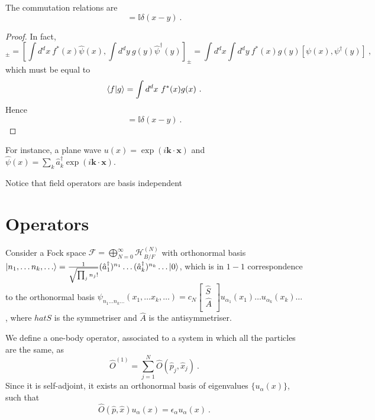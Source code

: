     The commutation relations are 
    \begin{equation*}
        [\psi(x), \psi^\dagger (y)] = \mathbb I \delta (x - y) ~.
    \end{equation*}
    \begin{proof}
        In fact,
        \begin{equation*}
            [\hat \psi (f), \hat \psi^\dagger (g)]_\pm = [\int d^d x ~ f^* (x) \hat \psi(x), \int d^d y ~ g(y) \hat \psi^\dagger (y)]_\pm = \int d^d x \int d^d y ~ f^*(x) g(y) [\psi(x), \psi^\dagger (y)]  ~,
        \end{equation*}
        which must be equal to 
        \begin{equation*}
            \langle f\vert g\rangle = \int d^d x ~ f^* (x) g(x) ~.
        \end{equation*}
        Hence 
        \begin{equation*}
            [\psi(x), \psi^\dagger (y)] = \mathbb I \delta (x - y) ~.
        \end{equation*}
    \end{proof}

    For instance, a plane wave $u(x) = \exp (i \mathbf k \cdot \mathbf x) $ and $\hat \psi(x) = \sum_k \hat a_k^\dagger \exp(i \mathbf k \cdot \mathbf x)$.

    Notice that field operators are basis independent

\section{Operators}

    Consider a Fock space $\mathcal F = \bigoplus_{N=0}^\infty \mathcal H^{(N)}_{B/F}$ with orthonormal basis $\vert n_1, \ldots n_k, \ldots\rangle = \frac{1}{\sqrt{\prod_j n_j !}} (\hat a^\dagger_1)^{n_1} \ldots (\hat a_k^\dagger)^{n_k} \ldots \vert0\rangle$, which is in $1-1$ correspondence to the orthonormal basis $\psi_{n_1 \ldots n_k \ldots} (x_1, \ldots x_k, \ldots) = c_N \begin{bmatrix} \hat S \\ \hat A \\ \end{bmatrix} u_{\alpha_1} (x_1) \ldots u_{\alpha_k} (x_k) \ldots$, where $hat S$ is the symmetriser and $\hat A$ is the antisymmetriser.

    We define a one-body operator, associated to a system in which all the particles are the same, as 
    \begin{equation*}
        \hat O^{(1)} = \sum_{j=1}^{N} \hat O(\hat p_j, \hat x_j) ~.
    \end{equation*}
    Since it is self-adjoint, it exists an orthonormal basis of eigenvalues $\{u_\alpha (x)\}$, such that 
    \begin{equation*}
        \hat O(\hat p, \hat x) u_\alpha (x) = \epsilon_\alpha u_\alpha (x) ~.
    \end{equation*}

